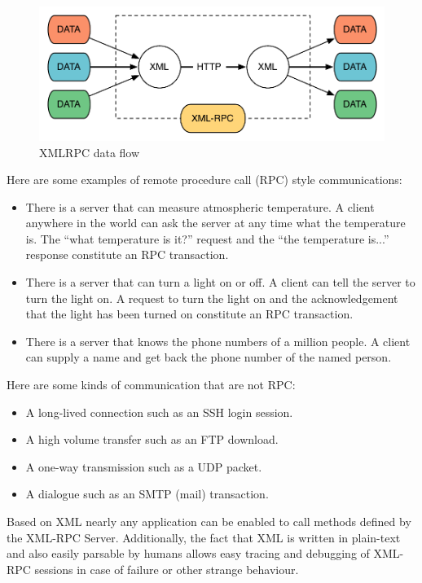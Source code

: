 \begin{figure}[hbt]
	\center
	\includegraphics[scale=0.5]{intro/xmlrpc}
	\caption{XMLRPC data flow}
	\label{fig:xmlrpc}
\end{figure}

Here are some examples of remote procedure call (RPC) style communications:

\begin{itemize}
	\item There is a server that can measure atmospheric temperature. A client
		anywhere in the world can ask the server at any time what the
		temperature is. The ``what temperature is it?'' request and the
		``the temperature is...'' response constitute an RPC transaction.
	\item There is a server that can turn a light on or off. A client can tell
		the server to turn the light on. A request to turn the light on and
		the acknowledgement that the light has been turned on constitute an
		RPC transaction.
	\item There is a server that knows the phone numbers of a million people.
		A client can supply a name and get back the phone number of the named
		person.
\end{itemize}

Here are some kinds of communication that are not RPC:

\begin{itemize}
	\item A long-lived connection such as an SSH login session.
	\item A high volume transfer such as an FTP download.
	\item A one-way transmission such as a UDP packet.
	\item A dialogue such as an SMTP (mail) transaction.
\end{itemize}

Based on XML nearly any application can be enabled to call methods defined by
the XML-RPC Server. Additionally, the fact that XML is written in plain-text
and also easily parsable by humans allows easy tracing and debugging of XML-RPC
sessions in case of failure or other strange behaviour.

